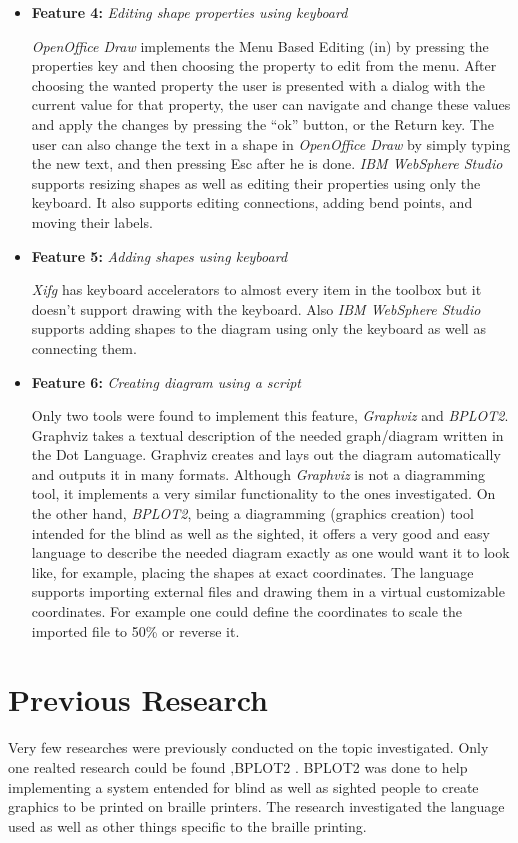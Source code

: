 \begin{itemize}
\item {\bf Feature 4:} {\em Editing shape properties using keyboard}
\par \noindent
{\em OpenOffice Draw} implements the Menu Based Editing (in) by pressing the properties key and then choosing the property to edit from the menu. After choosing the wanted property the user is presented with a dialog with the current value for that property, the user can navigate and change these values and apply the changes by pressing the ``ok'' button, or the Return key. The user can also change the text in a shape in {\em OpenOffice Draw} by simply typing the new text, and then pressing Esc after he is done. {\em IBM WebSphere Studio} supports resizing shapes as well as editing their properties using only the keyboard. It also supports editing connections, adding bend points, and moving their labels.


\item {\bf Feature 5:} {\em Adding shapes using keyboard}
\par \noindent
{\em Xifg} has keyboard accelerators to almost every item in the toolbox but it doesn't support drawing with the keyboard. Also {\em IBM WebSphere Studio} supports adding shapes to the diagram using only the keyboard as well as connecting them.

\item {\bf Feature 6:} {\em Creating diagram using a script}
\par \noindent
Only two tools were found to implement this feature, {\em Graphviz} and {\em BPLOT2}. Graphviz takes a textual description of the needed graph/diagram written in the Dot Language\cite{dot_lang}. Graphviz creates and lays out the diagram automatically and outputs it in many formats. Although {\em Graphviz} is not a diagramming tool, it implements a very similar functionality to the ones investigated. On the other hand, {\em BPLOT2}, being a diagramming (graphics creation) tool intended for the blind as well as the sighted, it offers a very good and easy language to describe the needed diagram exactly as one would want it to look like, for example, placing the shapes at exact coordinates. The language supports importing external files and drawing them in a virtual customizable coordinates. For example one could define the coordinates to scale the imported file to 50\% or reverse it.

\end{itemize}


\section{Previous Research}
Very few researches were previously conducted on the topic investigated. Only one realted research could be found ,BPLOT2 \cite{bplot2}. BPLOT2 was done to help implementing a system entended for blind as well as sighted people to create graphics to be printed on braille printers. The research investigated the language used as well as other things specific to the braille printing.